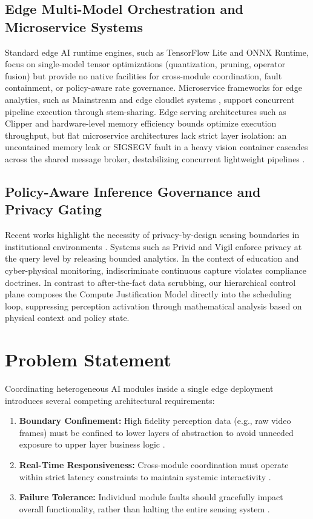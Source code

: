\documentclass[conference]{IEEEtran}
\begin{document}
\subsection{Edge Multi-Model Orchestration and Microservice Systems}
Standard edge AI runtime engines, such as TensorFlow Lite \cite{b10, b31} and ONNX Runtime, focus on single-model tensor optimizations (quantization, pruning, operator fusion) but provide no native facilities for cross-module coordination, fault containment, or policy-aware rate governance. Microservice frameworks for edge analytics, such as Mainstream \cite{b21} and edge cloudlet systems \cite{b6, b23}, support concurrent pipeline execution through stem-sharing. Edge serving architectures such as Clipper \cite{b22} and hardware-level memory efficiency bounds \cite{b40} optimize execution throughput, but flat microservice architectures lack strict layer isolation: an uncontained memory leak or SIGSEGV fault in a heavy vision container cascades across the shared message broker, destabilizing concurrent lightweight pipelines \cite{b24, b18}.

\subsection{Policy-Aware Inference Governance and Privacy Gating}
Recent works highlight the necessity of privacy-by-design sensing boundaries in institutional environments \cite{b4, b27}. Systems such as Privid \cite{b27} and Vigil \cite{b37} enforce privacy at the query level by releasing bounded analytics. In the context of education and cyber-physical monitoring, indiscriminate continuous capture violates compliance doctrines. In contrast to after-the-fact data scrubbing, our hierarchical control plane composes the Compute Justification Model directly into the scheduling loop, suppressing perception activation through mathematical analysis based on physical context and policy state.

\section{Problem Statement}

Coordinating heterogeneous AI modules inside a single edge deployment introduces several competing architectural requirements:
\begin{enumerate}
    \item \textbf{Boundary Confinement:} High fidelity perception data (e.g., raw video frames) must be confined to lower layers of abstraction to avoid unneeded exposure to upper layer business logic \cite{b27}.
    \item \textbf{Real-Time Responsiveness:} Cross-module coordination must operate within strict latency constraints to maintain systemic interactivity \cite{b21}.
    \item \textbf{Failure Tolerance:} Individual module faults should gracefully impact overall functionality, rather than halting the entire sensing system \cite{b24}.
\end{enumerate}
\end{document}
